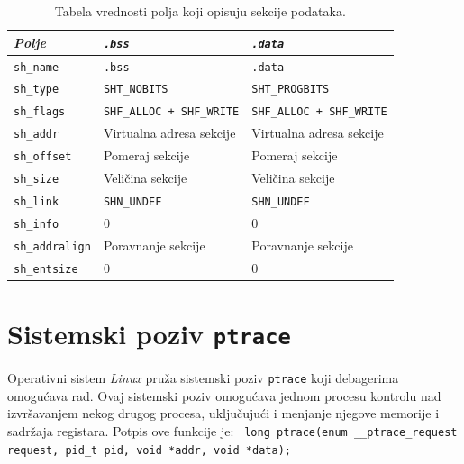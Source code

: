\documentclass[12pt,oneside]{memoir}
\begin{document}
\begin{table}
	\begin{center}
		\begin{tabular}{ | l | p{5cm} | p{5cm} |}
			\hline
			\emph{Polje} & \emph{\texttt{.bss}} & \emph{\texttt{.data}} \\ \hline
			\texttt{sh\_name} & \texttt{.bss} & \texttt{.data} \\ \hline
			\texttt{sh\_type} & \texttt{SHT\_NOBITS} & \texttt{SHT\_PROGBITS} \\ \hline
			\texttt{sh\_flags} & \texttt{SHF\_ALLOC + SHF\_WRITE} & \texttt{SHF\_ALLOC + SHF\_WRITE} \\ \hline
			\texttt{sh\_addr} & Virtualna adresa sekcije & Virtualna adresa sekcije \\ \hline
			\texttt{sh\_offset} & Pomeraj sekcije & Pomeraj sekcije \\ \hline
			\texttt{sh\_size} & Veličina sekcije & Veličina sekcije \\ \hline
			\texttt{sh\_link} & \texttt{SHN\_UNDEF} & \texttt{SHN\_UNDEF} \\ \hline
			\texttt{sh\_info} & 0 & 0 \\ \hline
			\texttt{sh\_addralign} & Poravnanje sekcije & Poravnanje sekcije \\ \hline
			\texttt{sh\_entsize} & 0 & 0 \\ \hline
		\end{tabular}
	\end{center}
	\caption{\label{tab:elf_secs}Tabela vrednosti polja koji opisuju sekcije podataka.}
\end{table}

\section{Sistemski poziv \texttt{ptrace}}

Operativni sistem \emph{Linux} pruža sistemski poziv \texttt{ptrace} \cite{ptrace} koji debagerima omogućava rad. Ovaj sistemski poziv omogućava jednom procesu kontrolu nad izvršavanjem nekog drugog procesa, uključujući i menjanje njegove memorije i sadržaja registara.
Potpis ove funkcije je:
\newline\newline
\texttt{ long ptrace\newline(enum \_\_ptrace\_request request, pid\_t pid, void *addr, void *data);}
\newline
\end{document}
